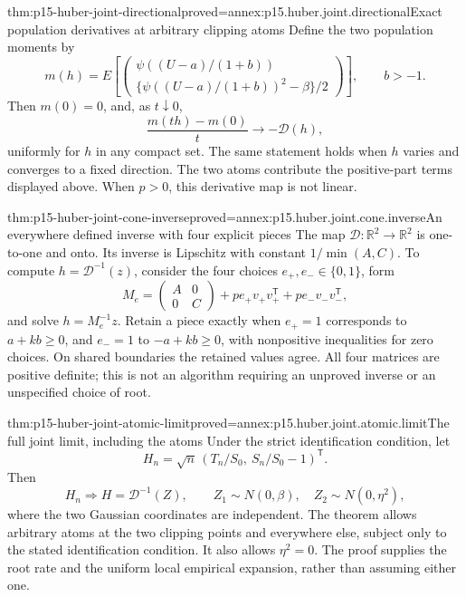 \begin{hbtheorem}{thm:p15-huber-joint-directional}{proved=annex:p15.huber.joint.directional}{Exact population derivatives at arbitrary clipping atoms}
Define the two population moments by
\[
 m(h)=E\left[
 \begin{pmatrix}
 \psi((U-a)/(1+b))\\
 \{\psi((U-a)/(1+b))^2-\beta\}/2
 \end{pmatrix}\right],\qquad b>-1.
\]
Then \(m(0)=0\), and, as \(t\downarrow0\),
\[
                 \frac{m(th)-m(0)}t\longrightarrow-\mathcal D(h),
\]
uniformly for \(h\) in any compact set. The same statement holds
when \(h\) varies and converges to a fixed direction.
The two atoms contribute the positive-part terms displayed above.
When \(p>0\), this derivative map is not linear.
\end{hbtheorem}

\begin{hbtheorem}{thm:p15-huber-joint-cone-inverse}{proved=annex:p15.huber.joint.cone.inverse}{An everywhere defined inverse with four explicit pieces}
The map \(\mathcal D:\mathbb R^2\to\mathbb R^2\) is one-to-one
and onto. Its inverse is Lipschitz with constant
\(1/\min(A,C)\). To compute \(h=\mathcal D^{-1}(z)\), consider
the four choices \(e_+,e_-\in\{0,1\}\), form
\[
 M_e=
 \begin{pmatrix}A&0\\0&C\end{pmatrix}
       +p e_+v_+v_+^{\mathsf T}+p e_-v_-v_-^{\mathsf T},
\]
and solve \(h=M_e^{-1}z\). Retain a piece exactly when
\(e_+=1\) corresponds to \(a+kb\geq0\), and \(e_-=1\)
to \(-a+kb\geq0\), with nonpositive inequalities for zero choices.
On shared boundaries the retained values agree.
All four matrices are positive definite; this is not an algorithm
requiring an unproved inverse or an unspecified choice of root.
\end{hbtheorem}

\begin{hbtheorem}{thm:p15-huber-joint-atomic-limit}{proved=annex:p15.huber.joint.atomic.limit}{The full joint limit, including the atoms}
Under the strict identification condition, let
\[
 H_n=\sqrt n\,(T_n/S_0,\ S_n/S_0-1)^{\mathsf T}.
\]
Then
\[
 H_n\Longrightarrow H=\mathcal D^{-1}(Z),\qquad
 Z_1\sim N(0,\beta),\quad Z_2\sim N(0,\eta^2),
\]
where the two Gaussian coordinates are independent.
The theorem allows arbitrary atoms at the two clipping points
and everywhere else, subject only to the stated identification
condition. It also allows \(\eta^2=0\).
The proof supplies the root rate and the uniform local empirical
expansion, rather than assuming either one.
\end{hbtheorem}


